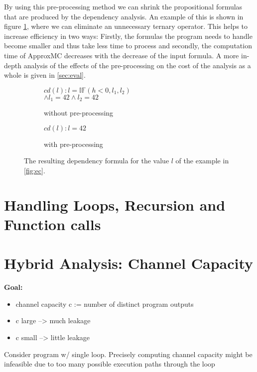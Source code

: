 By using this pre-processing method we can shrink the propositional formulas that are produced by the dependency analysis. An example of this is shown in figure \ref{fig:ppRes}, where we can eliminate an unnecessary ternary operator. This helps to increase efficiency in two ways: Firstly, the formulas the program needs to handle become smaller and thus take less time to process and secondly, the computation time of ApproxMC decreases with the decrease of the input formula. A more in-depth analysis of the effects of the pre-processing on the cost of the analysis as a whole is given in \ref{sec:eval}. 

\begin{figure}
    \begin{subfigure}[t]{.4\textwidth}
        \centering
        $cd(l) : l = \mathbb{IF}(h < 0, l_1, l_2)$ \\ $\land l_1 = 42 \land l_2 = 42$
        \caption{without pre-processing}
    \end{subfigure}
    \hfill
    \begin{subfigure}[t]{.4\textwidth}
        \centering
        $cd(l) : l = 42$
        \vspace{\baselineskip}
        \caption{with pre-processing}
    \end{subfigure}
    \caption{The resulting dependency formula for the value $l$ of the example in \ref{fig:ec}. }
    \label{fig:ppRes}
\end{figure}

\section{Handling Loops, Recursion and Function calls}

\section{Hybrid Analysis: Channel Capacity}
\textbf{Goal:}
\begin{itemize}
    \item channel capacity c := number of distinct program outputs
    \item c large --> much leakage
    \item c small --> little leakage
\end{itemize}
Consider program w/ single loop. Precisely computing channel capacity might be infeasible due to too many possible execution paths through the loop

